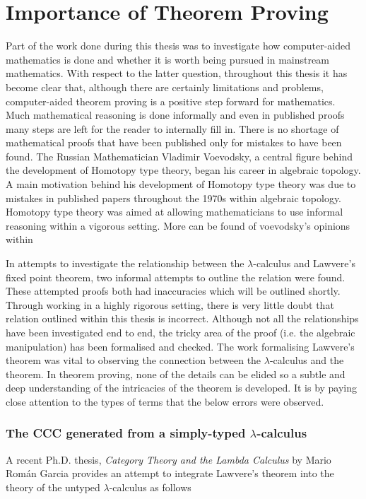 \section{Importance of Theorem Proving}
Part of the  work done during this thesis was to investigate how computer-aided
mathematics is done and whether it is worth being pursued in mainstream
mathematics. With respect to the latter question, throughout this thesis it has
become clear that, although there are certainly limitations and problems,
computer-aided theorem proving is a positive step forward for mathematics. Much
mathematical reasoning is done informally and even in published proofs many
steps are left for the reader to internally fill in. There is no shortage of
mathematical proofs that have been published only for mistakes to have been
found. The Russian Mathematician Vladimir Voevodsky, a central figure behind the
development of Homotopy type theory, began his career in algebraic topology. A
main motivation behind his development of Homotopy type theory was due to
mistakes in published papers throughout the 1970s within algebraic topology.
Homotopy type theory was aimed at allowing mathematicians to use informal
reasoning within a vigorous setting. More can be found of voevodsky's opinions
within 

In attempts to investigate the relationship between the $\lambda$-calculus and
Lawvere's fixed point theorem, two informal attempts to outline the relation
were found. These attempted proofs both had inaccuracies which will be outlined
shortly. Through working in a highly rigorous setting, there is very little
doubt that relation outlined within this thesis is incorrect. Although not all
the relationships have been investigated end to end, the tricky area of the proof
(i.e. the algebraic manipulation) has been formalised and checked. The work
formalising Lawvere's theorem was vital to observing the connection between the
$\lambda$-calculus and the theorem. In theorem proving, none of the details can
be elided so a subtle and deep understanding of the intricacies of the theorem
is developed. It is by paying close attention to the types of terms that the
below errors were observed.

\subsubsection{The CCC generated from a simply-typed $\lambda$-calculus}

A recent Ph.D. thesis, \textit{Category Theory and the Lambda Calculus} by Mario
Rom\'an Garcia provides an attempt to integrate Lawvere's theorem into the
theory of the untyped $\lambda$-calculus as follows

